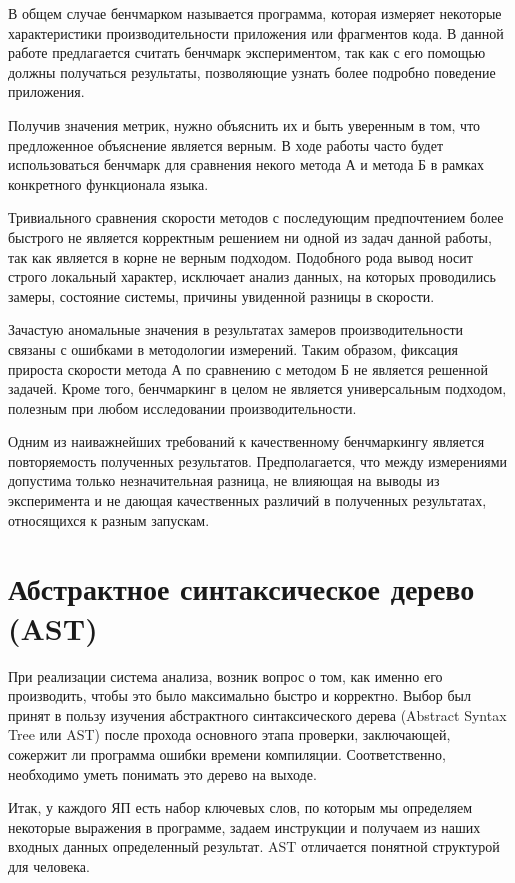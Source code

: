 \documentclass{mipt-thesis-bs}
\begin{document}
В общем случае бенчмарком называется программа, которая измеряет некоторые характеристики
производительности приложения или фрагментов кода. В данной работе предлагается считать
бенчмарк экспериментом, так как с его помощью должны получаться результаты, позволяющие
узнать более подробно поведение приложения.

Получив значения метрик, нужно объяснить их и быть уверенным в том, что предложенное
объяснение является верным. В ходе работы часто будет использоваться бенчмарк для
сравнения некого метода А и метода Б в рамках конкретного функционала языка.

Тривиального сравнения скорости методов с последующим предпочтением более быстрого не является
корректным решением ни одной из задач данной работы, так как является в корне не верным подходом.
Подобного рода вывод носит строго локальный характер, исключает анализ данных, на которых
проводились замеры, состояние системы, причины увиденной разницы в скорости.

Зачастую аномальные значения в результатах замеров производительности связаны с
ошибками в методологии измерений. Таким образом, фиксация прироста скорости метода А по сравнению
с методом Б не является решенной задачей. Кроме того, бенчмаркинг в целом не является
универсальным подходом, полезным при любом исследовании производительности.

Одним из наиважнейших требований к качественному бенчмаркингу является повторяемость
полученных результатов. Предполагается, что между измерениями допустима только незначительная
разница, не влияющая на выводы из эксперимента и не дающая качественных различий в полученных
результатах, относящихся к разным запускам.

\section{Абстрактное синтаксическое дерево (AST)}

При реализации система анализа, возник вопрос о том, как именно его производить, чтобы это
было максимально быстро и корректно. Выбор был принят в пользу изучения абстрактного
синтаксического дерева (Abstract Syntax Tree или AST) после прохода основного
этапа проверки, заключающей, сожержит ли программа ошибки времени компиляции. Соответственно, необходимо
уметь понимать это дерево на выходе.

Итак, у каждого ЯП есть набор ключевых слов, по которым мы определяем некоторые выражения в программе,
задаем инструкции и получаем из наших входных данных определенный результат. AST отличается понятной
структурой для человека.
\end{document}
